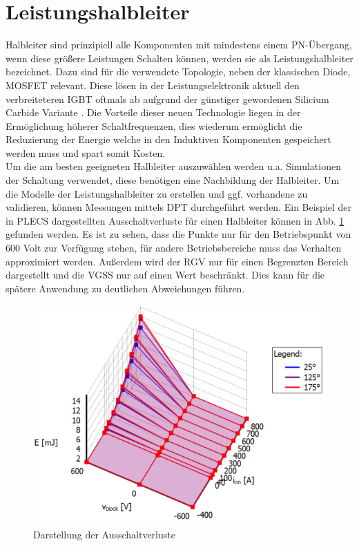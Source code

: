 \section{Leistungshalbleiter}
Halbleiter sind prinzipiell alle Komponenten mit mindestens einem PN-Übergang, wenn diese größere Leistungen Schalten können, werden sie als Leistungshalbleiter bezeichnet. Dazu sind für die verwendete Topologie, neben der klassischen Diode, \gls{MOSFET}  relevant. Diese lösen in der Leistungselektronik aktuell den verbreiteteren IGBT oftmals ab aufgrund der günstiger gewordenen Silicium Carbide Variante \cite{SiCTrend}. Die Vorteile dieser neuen Technologie liegen in der Ermöglichung höherer Schaltfrequenzen, dies wiederum ermöglicht die Reduzierung der Energie welche in den Induktiven Komponenten gespeichert werden muss und spart somit Kosten.\\
Um die am besten geeigneten Halbleiter auszuwählen werden u.a. Simulationen der Schaltung verwendet, diese benötigen eine Nachbildung der Halbleiter. Um die Modelle der Leistungshalbleiter zu erstellen und ggf. vorhandene zu validieren, können Messungen mittels \gls{DPT} durchgeführt werden. Ein Beispiel der in \gls{PLECS} dargestellten Ausschaltverluste für einen Halbleiter können in Abb. \ref{fig:plecsff2thermalmodel} gefunden werden. Es ist zu sehen, dass die Punkte nur für den Betriebspunkt von 600 Volt zur Verfügung stehen, für andere Betriebsbereiche muss das Verhalten approximiert werden. Außerdem wird der \gls{RGV} nur für einen Begrenzten Bereich dargestellt und die \gls{VGSS} nur auf einen Wert beschränkt. Dies kann für die spätere Anwendung zu deutlichen Abweichungen führen.
\begin{figure}
	\centering
	\includegraphics[width=0.7\linewidth]{content/Grafiken/PLECS_FF2ThermalModel}
	\caption[Darstellung der Ausschaltverluste]{Darstellung der Ausschaltverluste}
	\label{fig:plecsff2thermalmodel}
\end{figure}

